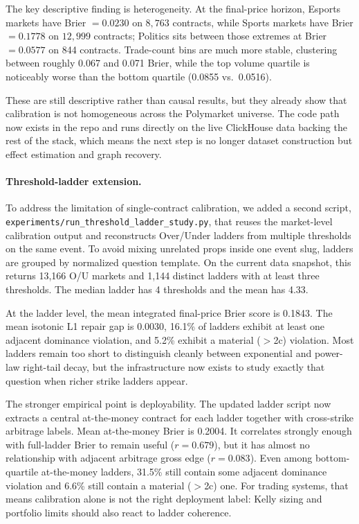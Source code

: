 \documentclass[10pt]{article}
\begin{document}
The key descriptive finding is heterogeneity. At the final-price horizon,
Esports markets have Brier $=0.0230$ on $8{,}763$ contracts, while Sports
markets have Brier $=0.1778$ on $12{,}999$ contracts; Politics sits between
those extremes at Brier $=0.0577$ on 844 contracts. Trade-count bins are much
more stable, clustering between roughly 0.067 and 0.071 Brier, while the top
volume quartile is noticeably worse than the bottom quartile (0.0855 vs.\ 0.0516).

These are still descriptive rather than causal results, but they already show
that calibration is not homogeneous across the Polymarket universe. The code
path now exists in the repo and runs directly on the live ClickHouse data
backing the rest of the stack, which means the next step is no longer dataset
construction but effect estimation and graph recovery.

\paragraph{Threshold-ladder extension.}
To address the limitation of single-contract calibration, we added a second
script, \texttt{experiments/run\_threshold\_ladder\_study.py}, that reuses the
market-level calibration output and reconstructs Over/Under ladders from
multiple thresholds on the same event. To avoid mixing unrelated props inside
one event slug, ladders are grouped by normalized question template. On the
current data snapshot, this returns 13{,}166 O/U markets and 1{,}144 distinct
ladders with at least three thresholds. The median ladder has 4 thresholds and
the mean has 4.33.

At the ladder level, the mean integrated final-price Brier score is 0.1843.
The mean isotonic L1 repair gap is 0.0030, 16.1\% of ladders exhibit at least
one adjacent dominance violation, and 5.2\% exhibit a material ($>$2c)
violation. Most ladders remain too short to distinguish cleanly between
exponential and power-law right-tail decay, but the infrastructure now exists
to study exactly that question when richer strike ladders appear.

The stronger empirical point is deployability. The updated ladder script now
extracts a central at-the-money contract for each ladder together with
cross-strike arbitrage labels. Mean at-the-money Brier is 0.2004. It correlates
strongly enough with full-ladder Brier to remain useful ($r=0.679$), but it has
almost no relationship with adjacent arbitrage gross edge ($r=0.083$). Even
among bottom-quartile at-the-money ladders, 31.5\% still contain some adjacent
dominance violation and 6.6\% still contain a material ($>$2c) one. For
trading systems, that means calibration alone is not the right deployment
label: Kelly sizing and portfolio limits should also react to ladder coherence.
\end{document}
